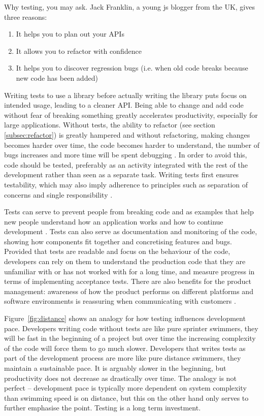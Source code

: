 \documentclass[11pt]{article}
\begin{document}
Why testing, you may ask. Jack Franklin, a young \gls{js} blogger from the UK, gives three reasons:

\begin{enumerate}
\item It helps you to plan out your APIs
\item It allows you to refactor with confidence
\item It helps you to discover regression bugs (i.e. when old code breaks because new code has been added)
\end{enumerate}

Writing tests to use a library before actually writing the library puts focus on intended usage, leading to a cleaner API. Being able to change and add code without fear of breaking something greatly accelerates productivity, especially for large applications. \cite{JackFranklin} Without tests, the ability to refactor (see section \ref{subsec:refactor}) is greatly hampered and without refactoring, making changes becomes harder over time, the code becomes harder to understand, the number of bugs increases and more time will be spent debugging \cite[p.~47-49]{Refactoring}. In order to avoid this, code should be tested, preferably as an activity integrated with the rest of the development rather than seen as a separate task. Writing tests first ensures testability, which may also imply adherence to principles such as separation of concerns and single responsibility \cite[p.~35-37]{Clean}.

Tests can serve to prevent people from breaking code and as examples that help new people understand how an application works and how to continue development \cite[questions~31-32]{Edelstam}. Tests can also serve as documentation and monitoring of the code, showing how components fit together and concretising features and bugs. Provided that tests are readable and focus on the behaviour of the code, developers can rely on them to understand the production code that they are unfamiliar with or has not worked with for a long time, and measure progress in terms of implementing acceptance tests. There are also benefits for the product management: awareness of how the product performs on different platforms and software environments is reassuring when communicating with customers \cite[question~38]{Ahnve}.

Figure~\ref{fig:distance} shows an analogy for how testing influences development pace. Developers writing code without tests are like pure sprinter swimmers, they will be fast in the beginning of a project but over time the increasing complexity of the code will force them to go much slower. Developers that writes tests as part of the development process are more like pure distance swimmers, they maintain a sustainable pace. It is arguably slower in the beginning, but productivity does not decrease as drastically over time. The analogy is not perfect -- development pace is typically more dependent on system complexity than swimming speed is on distance, but this on the other hand only serves to further emphasise the point. Testing is a long term investment.
\end{document}
